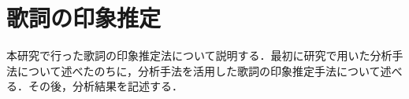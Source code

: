 \documentclass[a4paper,11pt,oneside,openany]{jsbook}
\begin{document}
\chapter{歌詞の印象推定}
本研究で行った歌詞の印象推定法について説明する．最初に研究で用いた分析手法について述べたのちに，分析手法を活用した歌詞の印象推定手法について述べる．その後，分析結果を記述する．



%
\end{document}
